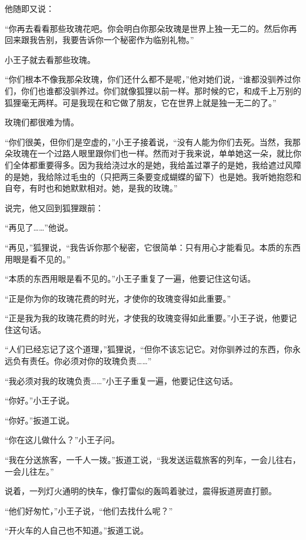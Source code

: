他随即又说：

“你再去看看那些玫瑰花吧。你会明白你那朵玫瑰是世界上独一无二的。然后你再回来跟我告别，我要告诉你一个秘密作为临别礼物。”

小王子就去看那些玫瑰。

“你们根本不像我那朵玫瑰，你们还什么都不是呢，”他对她们说，“谁都没驯养过你们，你们也谁都没驯养过。你们就像狐狸以前一样。那时候的它，和成千上万别的狐狸毫无两样。可是我现在和它做了朋友，它在世界上就是独一无二的了。”

玫瑰们都很难为情。

“你们很美，但你们是空虚的，”小王子接着说，“没有人能为你们去死。当然，我那朵玫瑰在一个过路人眼里跟你们也一样。然而对于我来说，单单她这一朵，就比你们全体都重要得多。因为我给浇过水的是她，我给盖过罩子的是她，我给遮过风障的是她，我给除过毛虫的（只把两三条要变成蝴蝶的留下）也是她。我听她抱怨和自夸，有时也和她默默相对。她，是我的玫瑰。”

说完，他又回到狐狸跟前：

“再见了\ldots{}\ldots{}”他说。

“再见，”狐狸说，“我告诉你那个秘密，它很简单：只有用心才能看见。本质的东西用眼是看不见的。”

“本质的东西用眼是看不见的。”小王子重复了一遍，他要记住这句话。

“正是你为你的玫瑰花费的时光，才使你的玫瑰变得如此重要。”

“正是我为我的玫瑰花费的时光，才使我的玫瑰变得如此重要。”小王子说，他要记住这句话。

“人们已经忘记了这个道理，”狐狸说，“但你不该忘记它。对你驯养过的东西，你永远负有责任。你必须对你的玫瑰负责\ldots{}\ldots{}”

“我必须对我的玫瑰负责\ldots{}\ldots{}”小王子重复一遍，他要记住这句话。


\stoptitle

\starttitle[title={22},reference={part0024.html_a025}]

“你好。”小王子说。

“你好。”扳道工说。

“你在这儿做什么？”小王子问。

“我在分送旅客，一千人一拨。”扳道工说，“我发送运载旅客的列车，一会儿往右，一会儿往左。”

说着，一列灯火通明的快车，像打雷似的轰鸣着驶过，震得扳道房直打颤。

“他们好匆忙，”小王子说，“他们去找什么呢？”

“开火车的人自己也不知道。”扳道工说。

